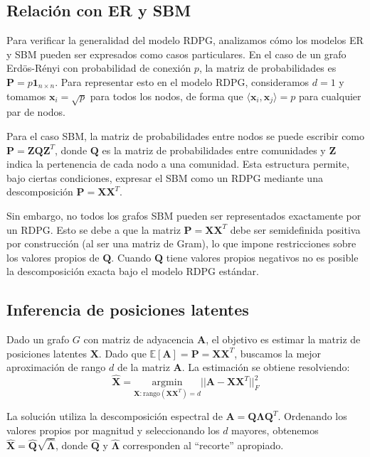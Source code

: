 \documentclass{article}
\begin{document}
\subsection{Relación con ER y SBM}

Para verificar la generalidad del modelo RDPG, analizamos cómo los modelos ER y SBM pueden ser expresados como casos particulares. En el caso de un grafo Erdös-Rényi con probabilidad de conexión $p$, la matriz de probabilidades es $\mathbf{P} = p \mathbf{1}_{n \times n}$. Para representar esto en el modelo RDPG, consideramos $d=1$ y tomamos $\mathbf{x}_i = \sqrt{p}$ para todos los nodos, de forma que $\langle \mathbf{x}_i, \mathbf{x}_j \rangle = p$ para cualquier par de nodos.

Para el caso SBM, la matriz de probabilidades entre nodos se puede escribir como $\mathbf{P} = \mathbf{Z}\mathbf{Q}\mathbf{Z}^T$, donde $\mathbf{Q}$ es la matriz de probabilidades entre comunidades y $\mathbf{Z}$ indica la pertenencia de cada nodo a una comunidad. Esta estructura permite, bajo ciertas condiciones, expresar el SBM como un RDPG mediante una descomposición $\mathbf{P} = \mathbf{X}\mathbf{X}^T$.

Sin embargo, no todos los grafos SBM pueden ser representados exactamente por un RDPG. Esto se debe a que la matriz $\mathbf{P} = \mathbf{X}\mathbf{X}^T$ debe ser semidefinida positiva por construcción (al ser una matriz de Gram), lo que impone restricciones sobre los valores propios de $\mathbf{Q}$. Cuando $\mathbf{Q}$ tiene valores propios negativos no es posible la descomposición exacta bajo el modelo RDPG estándar.

\subsection{Inferencia de posiciones latentes}

Dado un grafo $G$ con matriz de adyacencia $\mathbf{A}$, el objetivo es estimar la matriz de posiciones latentes $\mathbf{X}$. Dado que $\mathbb{E}[\mathbf{A}] = \mathbf{P} = \mathbf{X}\mathbf{X}^T$, buscamos la mejor aproximación de rango $d$ de la matriz $\mathbf{A}$. La estimación se obtiene resolviendo:
\begin{equation}
    \hat{\mathbf{X}} = \underset{\mathbf{X}: \text{rango}(\mathbf{X}\mathbf{X}^T) = d}{\mathrm{argmin}} ||\mathbf{A} - \mathbf{X}\mathbf{X}^T||^2_F
\end{equation}

La solución utiliza la descomposición espectral de $\mathbf{A} = \mathbf{Q}\boldsymbol{\Lambda}\mathbf{Q}^T$. Ordenando los valores propios por magnitud y seleccionando los $d$ mayores, obtenemos $\hat{\mathbf{X}} = \hat{\mathbf{Q}}\sqrt{\hat{\boldsymbol{\Lambda}}}$, donde $\hat{\mathbf{Q}}$ y $\hat{\boldsymbol{\Lambda}}$ corresponden al ``recorte'' apropiado.
\end{document}
